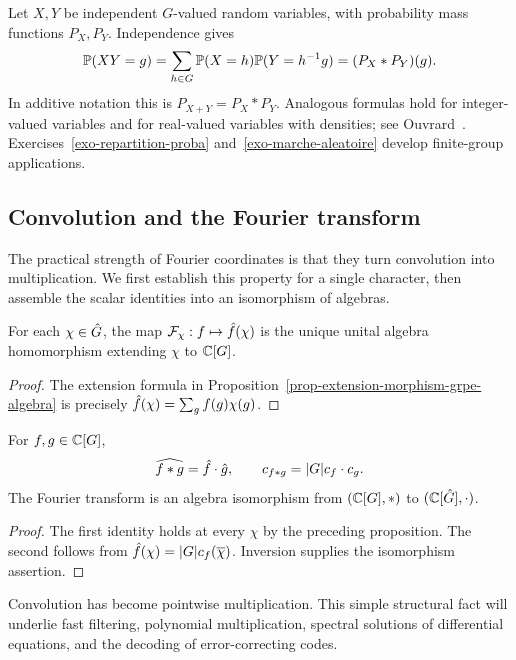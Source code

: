
\begin{rem}
\label{rmk-interpretation-proba}
Let $X,Y$ be independent $G$-valued random variables, with probability mass
functions $P_X,P_Y$. Independence gives
\[
 \mathbb{P}(XY=g)=\sum_{h\in G}\mathbb{P}(X=h)\mathbb{P}(Y=h^{-1}g)
 =(P_X*P_Y)(g).
\]
In additive notation this is $P_{X+Y}=P_X*P_Y$. Analogous formulas hold for
integer-valued variables and for real-valued variables with densities;
see Ouvrard~\cite{ouvrard-2}.
Exercises~\ref{exo-repartition-proba} and~\ref{exo-marche-aleatoire} develop
finite-group applications.
\end{rem}

\subsection{Convolution and the Fourier transform}
\label{sect2-convolution-transforme-fourier}

The practical strength of Fourier coordinates is that they turn convolution
into multiplication. We first establish this property for a single
character, then assemble the scalar identities into an isomorphism of
algebras.

\begin{prop}
\label{prop-thm-convol-fourier-grpe-finite}
For each $\chi\in\hat{G}$, the map
$\mathcal{F}_\chi:f\mapsto\hat{f}(\chi)$ is the unique unital algebra homomorphism
extending $\chi$ to $\mathbb{C}[G]$.
\end{prop}
\begin{proof}
The extension formula in Proposition~\ref{prop-extension-morphism-grpe-algebra}
is precisely $\hat{f}(\chi)=\sum_g f(g)\chi(g)$.
\end{proof}


\begin{thm}
\label{thm-convolution-trans-fourier-grpe-abelien}
For $f,g\in\mathbb{C}[G]$,
\begin{equation}
\label{eq-formula-convolution-functions-abelien-grpe}
 \widehat{f*g}=\hat{f}\cdot\hat{g},
 \qquad c_{f*g}=|G|c_f\cdot c_g.
\end{equation}
The Fourier transform is an algebra isomorphism from $(\mathbb{C}[G],*)$ to
$(\mathbb{C}[\hat{G}],\cdot)$.
\end{thm}
\begin{proof}
The first identity holds at every $\chi$ by the preceding proposition.
The second follows from $\hat{f}(\chi)=|G|c_f(\overline{\chi})$.
Inversion supplies the isomorphism assertion.
\end{proof}
Convolution has become pointwise multiplication. This simple structural fact
will underlie fast filtering, polynomial multiplication, spectral solutions
of differential equations, and the decoding of error-correcting codes.

